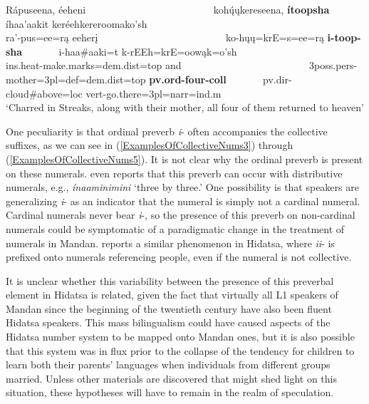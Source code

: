 \begin{exe}
\begin{xlist}
\item\label{ExamplesOfCollectiveNums5} \glll Rápuseena, éeheni ~ ~ ~ ~ ~ ~ ~ ~ ~ ~ ~ ~ ~ ~ ~ kohų́ųkereseena, \textbf{ítoopsha} ~ ~ ~ ~ íhaa'aakit keréehkereroomako'sh\\
    ra'-pus=ee=rą eeherį ~ ~ ~ ~ ~ ~ ~ ~ ~ ~ ~ ~ ~ ~ ~  ko-hųų=krE=s=ee=rą \textbf{i-toop-sha} ~ ~ ~ ~ i-haa\#aaki=t k-rEEh=krE=oowąk=o'sh\\
    ins.heat-\textnormal{make.marks}=dem.dist=top \textnormal{and} ~ ~ ~ ~ ~ ~ ~ ~ ~ ~ ~ ~ ~ ~ ~  3poss.pers-\textnormal{mother}=3pl=def=dem.dist=top \textbf{pv.ord-\textnormal{\bfseries four}-coll} ~ ~ ~ ~ pv.dir-\textnormal{cloud}\#\textnormal{above}=loc vert-\textnormal{go.there}=3pl=narr=ind.m\\
    \glt `Charred in Streaks, along with their mother, all four of them returned to heaven' \citep[175]{hollow1973a}

\end{xlist}

\end{exe}

One peculiarity is that ordinal preverb \textit{i}- often accompanies the collective suffixes, as we can see in (\ref{ExamplesOfCollectiveNums3}) through (\ref{ExamplesOfCollectiveNums5}). It is not clear why the ordinal preverb is present on these numerals. \citet[27]{hollow1970}
even reports that this preverb can occur with distributive numerals, e.g., \textit{ínaaminimini} `three by three.'  One possibility is that speakers are generalizing \textit{i}- as an indicator that the numeral is simply not a cardinal numeral. Cardinal numerals never bear \textit{i}-, so the presence of this preverb on non-cardinal numerals could be symptomatic of a paradigmatic change in the treatment of numerals in Mandan. \citet{park2021} reports a similar phenomenon in Hidatsa, where \textit{ii}- is prefixed onto numerals referencing people, even if the numeral is not collective. 

It is unclear whether this variability between the presence of this preverbal element in Hidatsa is related, given the fact that virtually all L1 speakers of Mandan since the beginning of the twentieth century have also been fluent Hidatsa speakers. This mass bilingualism could have caused aspects of the Hidatsa number system to be mapped onto Mandan ones, but it is also possible that this system was in flux prior to the collapse of the tendency for children to learn both their parents' languages when individuals from different groups married. Unless other materials are discovered that might shed light on this situation, these hypotheses will have to remain in the realm of speculation.


